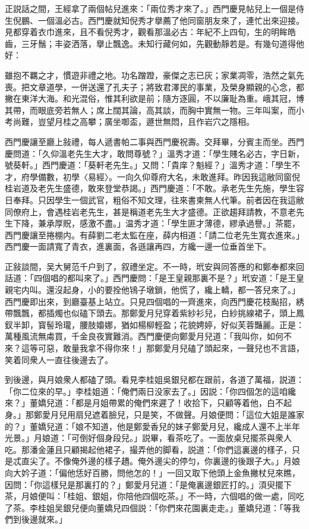 正説話之間，王經拿了兩個帖兒進來：「兩位秀才來了。」西門慶見帖兒上一個是侍生倪鵬、一個溫必古。西門慶就知倪秀才擧薦了他同窗朋友來了，連忙出來迎接。見都穿着衣巾進來，且不看倪秀才，觀看那溫必古：年紀不上四旬，生的明眸皓齒，三牙鬚；丰姿洒落，擧止飄逸。未知行藏何如，先觀動靜若是。有幾句道得他好：

\begin{myquote}
雖抱不羈之才，慣遊非禮之地。功名蹭蹬，豪傑之志已灰；家業凋零，浩然之氣先喪。把文章道學，一併送還了孔夫子；將致君澤民的事業，及榮身顯親的心念，都撇在東洋大海。和光混俗，惟其利欲是前；隨方逐圓，不以廉耻為重。峨其冠，博其帶，而眼底旁若無人；席上闊其論，高其談，而胸中實無一物。三年叫案，而小考尚難，豈望月桂之高攀；廣坐啣盃，遯世無悶，且作岩穴之隱相。
\end{myquote}

西門慶讓至廳上敍禮，每人遞書帕二事與西門慶祝壽。交拜畢，分賓主而坐。西門慶問道：「久仰溫老先生大才，敢問尊號？」溫秀才道：「學生賤名必古，字日新，號葵軒。」西門慶道：「葵軒老先生。」又問：「貴庠？魁經？」溫秀才道：「學生不才，府學備數，初學〈易經〉。一向久仰尊府大名，未敢進拜。昨因我這敝同窗倪桂岩道及老先生盛德，敢來登堂恭謁。」西門慶道：「不敢。承老先生先施，學生容日奉拜。只因學生一個武官，粗俗不知文理，往來書柬無人代筆。前者因在我這敝同僚府上，會遇桂岩老先生，甚是稱道老先生大才盛德。正欲趨拜請教，不意老先生下降，兼承厚貺，感激不盡。」温秀才道：「學生匪才薄德，繆承過譽。」茶罷，西門慶讓至捲棚内。有薛劉二老太監在座，薛内相道：「請二位老先生寬衣進來。」西門慶一面請寬了青衣，進裏面，各遜讓再四，方纔一邊一位垂首坐下。

正敍談間，吴大舅范千户到了，叙禮坐定。不一時，玳安與同答應的和鄭奉都來回話道：「四個唱的都叫來了。」西門慶問：「是王皇親那裏不是？」玳安道：「是王皇親宅内叫。還沒起身，小的要拴他鴇子墩鎖，他慌了，纔上轎，都一答兒來了。」西門慶即出來，到廳臺基上站立。只見四個唱的一齊進來，向西門慶花枝颭招，綉帶飄飄，都插燭也似磕下頭去。那鄭愛月兒穿着紫紗衫兒，白紗挑線裙子，頭上鳳釵半卸，寳髻玲瓏，腰肢嬝娜，猶如楊柳輕盈；花貌娉婷，好似芙蓉豔麗。正是：萬種風流無䖏買，千金良夜實難消。西門慶便向鄭愛月兒道：「我叫你，如何不來？這等可惡，敢量我拿不得你來！」那鄭愛月兒磕了頭起來，一聲兒也不言語，笑着同衆人一直往後邊去了。

到後邊，與月娘衆人都磕了頭。看見李桂姐吳銀兒都在跟前，各道了萬福，説道：「你二位來的早。」李桂姐道：「俺們兩日没家去了。」因説：「你四個怎的這咱纔來？」董嬌兒道：「都是月姐帶累的俺們來遲了！收拾下，只顧等着他，白不起身。」那鄭愛月兒用扇兒遮着臉兒，只是笑，不做聲。月娘便問：「這位大姐是誰家的？」董嬌兒道：「娘不知道，他是鄭愛香兒的妹子鄭愛月兒，纔成人還不上半年光景。」月娘道：「可倒好個身段兒。」説畢，看茶吃了。一面放桌兒擺茶與衆人吃。那潘金蓮且只顧揭起他裙子，撮弄他的脚看，説道：「你們這裏邊的樣子，只是忒直尖了。不像俺外邊的樣子趫。俺外邊尖的停匀，你裏邊的後跟子大。」月娘向大妗子道：「偏他恁好百勝，問他怎的！」一回又取下他頭上金魚撇杖兒來瞧，因問：「你這樣兒是那裏打的？」鄭愛月兒道：「是俺裏邊銀匠打的。」湏臾擺下茶，月娘便叫：「桂姐、銀姐，你陪他四個吃茶。」不一時，六個唱的做一處，同吃了茶。李桂姐吴銀兒便向董嬌兒四個説：「你們來花園裏走走。」董嬌兒道：「等我們到後邊就來。」


